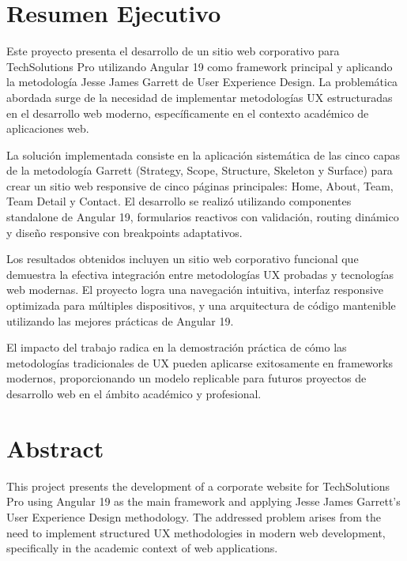 \thispagestyle{plain}
\chapter*{Resumen Ejecutivo}

Este proyecto presenta el desarrollo de un sitio web corporativo para TechSolutions Pro utilizando Angular 19 como framework principal y aplicando la metodología Jesse James Garrett de User Experience Design. La problemática abordada surge de la necesidad de implementar metodologías UX estructuradas en el desarrollo web moderno, específicamente en el contexto académico de aplicaciones web.

La solución implementada consiste en la aplicación sistemática de las cinco capas de la metodología Garrett (Strategy, Scope, Structure, Skeleton y Surface) para crear un sitio web responsive de cinco páginas principales: Home, About, Team, Team Detail y Contact. El desarrollo se realizó utilizando componentes standalone de Angular 19, formularios reactivos con validación, routing dinámico y diseño responsive con breakpoints adaptativos.

Los resultados obtenidos incluyen un sitio web corporativo funcional que demuestra la efectiva integración entre metodologías UX probadas y tecnologías web modernas. El proyecto logra una navegación intuitiva, interfaz responsive optimizada para múltiples dispositivos, y una arquitectura de código mantenible utilizando las mejores prácticas de Angular 19.

El impacto del trabajo radica en la demostración práctica de cómo las metodologías tradicionales de UX pueden aplicarse exitosamente en frameworks modernos, proporcionando un modelo replicable para futuros proyectos de desarrollo web en el ámbito académico y profesional.


\MediaOptionLogicBlank

\chapter*{Abstract}

This project presents the development of a corporate website for TechSolutions Pro using Angular 19 as the main framework and applying Jesse James Garrett's User Experience Design methodology. The addressed problem arises from the need to implement structured UX methodologies in modern web development, specifically in the academic context of web applications.

